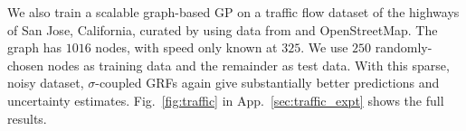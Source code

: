 We also train a scalable graph-based GP on a traffic flow dataset of the highways of San Jose, California, curated by \citet{borovitskiy2021matern} using  data from \citet{chen2001freeway} and OpenStreetMap.
The graph has $1016$ nodes, with speed only known at $325$. 
We use $250$ randomly-chosen nodes as training data and the remainder as test data.
With this sparse, noisy dataset, $\sigma$-coupled GRFs again give substantially better predictions and uncertainty estimates.
Fig.~\ref{fig:traffic} in App.~\ref{sec:traffic_expt} shows the full results.















